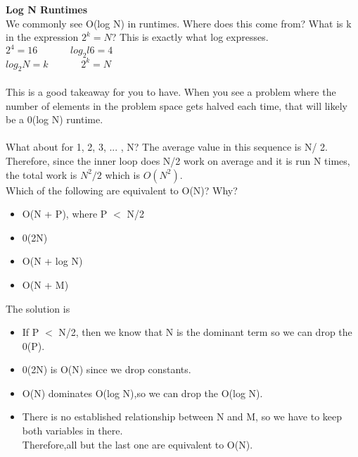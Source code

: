 \documentclass[14pt, noindent]{article}
\begin{document}
\textbf{Log N Runtimes}\\
We commonly see O(log N) in runtimes. Where does this come from?
What is k in the expression $2^k = N$? This is exactly what log expresses.\\
$2^4 = 16       \hspace{40pt}          log_2l6 = 4$\\
$log_2N = k     \hspace{40pt}          2^k = N      $\\\\
This is a good takeaway for you to have. When you see a problem where the number of elements
in the problem space gets halved each time, that will likely be a 0(log N) runtime.\\\\

What about for 1, 2, 3, ... , N? The average value in this sequence is N/ 2.
Therefore, since the inner loop does N/2 work on average and it is run N times, the total
work is  $N^2/2$ which is $O(N^2)$.\\

Which of the following are equivalent to O(N)? Why?
\begin{itemize}
\item O(N + P), where P $<$ N/2
\item 0(2N)
\item O(N + log N)
\item O(N + M)
\end{itemize}

The solution is
\begin{itemize}
\item If P $<$ N/2, then we know that N is the dominant term so we can drop the 0(P).
\item 0(2N) is O(N) since we drop constants.
\item O(N) dominates O(log N),so we can drop the O(log N).
\item There is no established relationship between N and M, so we have to keep both variables in there.\\
Therefore,all but the last one are equivalent to O(N).
\end{itemize}
\end{document}
